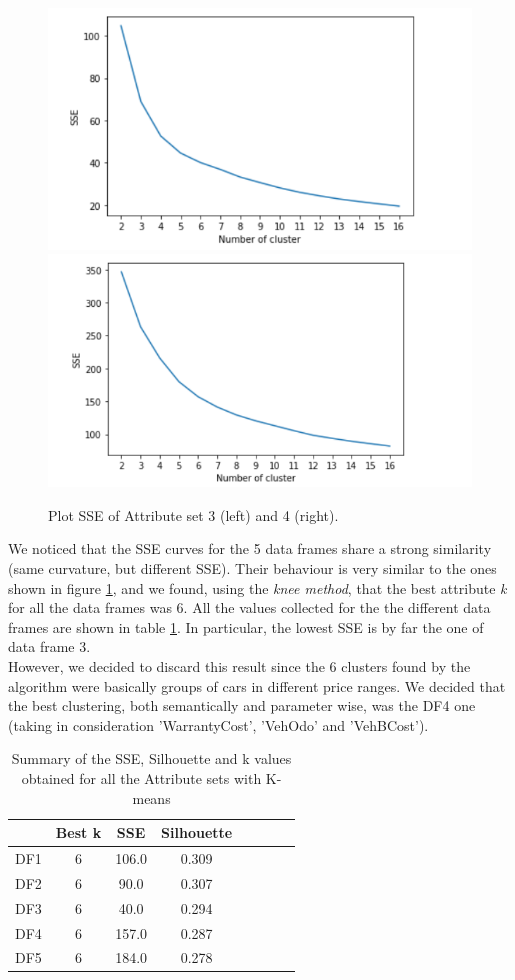 \documentclass{article}
\begin{document}
	
	\begin{figure}[H]
		\centering
		\includegraphics[width=.49\textwidth]{cattura}\hfill
		\includegraphics[width=.49\textwidth]{SSE2}\hfill
		\caption{Plot SSE of Attribute set 3 (left) and 4 (right).}
		\label{fig:KmeansSSE}
	\end{figure}
	We noticed that the SSE curves for the 5 data frames share a strong similarity (same curvature, but different SSE). Their behaviour is very similar to the ones shown in figure \ref{fig:KmeansSSE}, and we found, using the \emph{knee method}, that the best attribute \emph{k} for all the data frames was 6. All the values collected for the the different data frames are shown in table \ref{tab:SSESilu}. In particular, the lowest SSE is by far the one of data frame 3. \\However, we decided to discard this result since the 6 clusters found by the algorithm were basically groups of cars in different price ranges. We decided that the best clustering, both semantically and parameter wise, was the DF4 one (taking in consideration 'WarrantyCost', 'VehOdo' and 'VehBCost').
	
	\begin{table}[H]
		\centering
		\begin{tabular}{c|ccccccc}
			\hline
			&  Best k & SSE& Silhouette \\
			\hline
			\rowcolor{Gray}
			DF1 & 6 & 106.0 & 0.309 \\
			DF2 & 6 & 90.0 & 0.307  \\
			\rowcolor{Gray}
			DF3 & 6 & 40.0 & 0.294 \\
			DF4 & 6 & 157.0 & 0.287  \\
			\rowcolor{Gray}
			DF5 & 6 & 184.0\textbf & 0.278 \\
			\hline
		\end{tabular}
		\caption{{ Summary of the SSE, Silhouette and k values obtained for all the Attribute sets with K-means}}
		\label{tab:SSESilu}
	\end{table}
	
\end{document}
